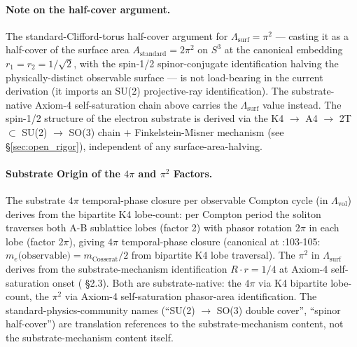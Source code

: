\paragraph{Note on the half-cover argument.} The standard-Clifford-torus half-cover argument for $\Lambda_{\text{surf}} = \pi^2$ --- casting it as a half-cover of the surface area $A_{\text{standard}} = 2\pi^2$ on $S^3$ at the canonical embedding $r_1 = r_2 = 1/\sqrt{2}$, with the spin-1/2 spinor-conjugate identification halving the physically-distinct observable surface --- is not load-bearing in the current derivation (it imports an SU(2) projective-ray identification). The substrate-native Axiom-4 self-saturation chain above carries the $\Lambda_{\text{surf}}$ value instead. The spin-1/2 structure of the electron substrate is derived via the K4 $\to$ A4 $\to$ 2T $\subset$ SU(2) $\to$ SO(3) chain $+$ Finkelstein-Misner mechanism (see \S\ref{sec:open_rigor}), independent of any surface-area-halving.

\paragraph{Substrate Origin of the $4\pi$ and $\pi^2$ Factors.}
The substrate $4\pi$ temporal-phase closure per observable Compton cycle (in $\Lambda_{\text{vol}}$) derives from the bipartite K4 lobe-count: per Compton period the soliton traverses both A-B sublattice lobes (factor 2) with phasor rotation $2\pi$ in each lobe (factor $2\pi$), giving $4\pi$ temporal-phase closure (canonical at :103-105: $m_e\text{(observable)} = m_\text{Cosserat}/2$ from bipartite K4 lobe traversal). The $\pi^2$ in $\Lambda_{\text{surf}}$ derives from the substrate-mechanism identification $R \cdot r = 1/4$ at Axiom-4 self-saturation onset ( \S2.3). Both are substrate-native: the $4\pi$ via K4 bipartite lobe-count, the $\pi^2$ via Axiom-4 self-saturation phasor-area identification. The standard-physics-community names (``SU(2) $\to$ SO(3) double cover'', ``spinor half-cover'') are translation references to the substrate-mechanism content, not the substrate-mechanism content itself.

